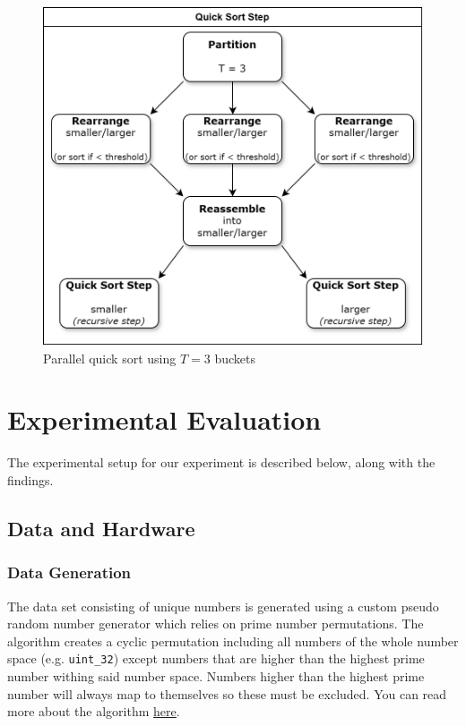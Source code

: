 \documentclass[twocolumn]{article}
\begin{document}
\begin{figure}[h]
    \includegraphics[scale=0.175]{./figures/parallel_quick_sort.png}
    \centering
    \caption{Parallel quick sort using $T=3$ buckets}
\end{figure}

\section{Experimental Evaluation}
The experimental setup for our experiment is described below, along with the findings.

\subsection{Data and Hardware}%
\label{sub:Data and Hardware}
\subsubsection{Data Generation}
The data set consisting of unique numbers is generated using a custom pseudo random number generator which relies on prime number permutations.
The algorithm creates a cyclic permutation including all numbers of the whole number space (e.g. \texttt{uint\_32}) except numbers that are higher than the highest prime number withing said number space.
Numbers higher than the highest prime number will always map to themselves so these must be excluded.
You can read more about the algorithm \underline{\href{https://preshing.com/20121224/how-to-generate-a-sequence-of-unique-random-integers/}{here}}.
\end{document}
